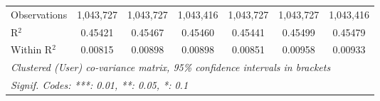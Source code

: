 \begin{table}[htbp]
\begin{threeparttable}[b]
\begin{tabular}{lcccccc}
         Observations               & 1,043,727        & 1,043,727        & 1,043,416       & 1,043,727        & 1,043,727        & 1,043,416\\  
         R$^2$                      & 0.45421          & 0.45467          & 0.45460         & 0.45441          & 0.45499          & 0.45479\\  
         Within R$^2$               & 0.00815          & 0.00898          & 0.00898         & 0.00851          & 0.00958          & 0.00933\\  
         \midrule \midrule
         \multicolumn{7}{l}{\emph{Clustered (User) co-variance matrix, 95\% confidence intervals in brackets}}\\
         \multicolumn{7}{l}{\emph{Signif. Codes: ***: 0.01, **: 0.05, *: 0.1}}\\
      \end{tabular}
   \end{threeparttable}
\end{table}


